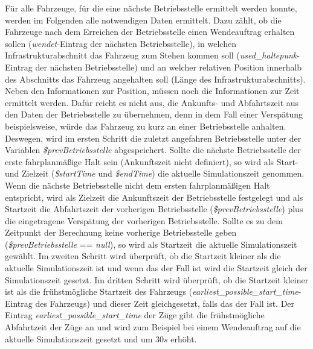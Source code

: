 Für alle Fahrzeuge, für die eine nächste Betriebsstelle ermittelt werden konnte, werden im Folgenden alle notwendigen Daten ermittelt. Dazu zählt, ob die Fahrzeuge nach dem Erreichen der Betriebsstelle einen Wendeauftrag erhalten sollen (\textit{wendet}-Eintrag der nächsten Betriebsstelle), in welchen Infrastrukturabschnitt das Fahrzeug zum Stehen kommen soll (\textit{used\_haltepunk}-Eintrag der nächsten Betriebsstelle) und an welcher relativen Position innerhalb des Abschnitts das Fahrzeug angehalten soll (Länge des Infrastrukturabschnitts). Neben den Informationen zur Position, müssen noch die Informationen zur Zeit ermittelt werden. Dafür reicht es nicht aus, die Ankunfts- und Abfahrtszeit aus den Daten der Betriebsstelle zu übernehmen, denn in dem Fall einer Verspätung beispielsweise, würde das Fahrzeug zu kurz an einer Betriebsstelle anhalten. Deswegen, wird im ersten Schritt die zuletzt angefahren Betriebsstelle unter der Variablen \textit{\$prevBetriebsstelle} abgespeichert. Sollte die nächste Betriebsstelle der erste fahrplanmäßige Halt sein (Ankunftszeit nicht definiert), so wird als Start- und Zielzeit (\textit{\$startTime} und \textit{\$endTime}) die aktuelle Simulationszeit genommen. Wenn die nächste Betriebsstelle nicht dem ersten fahrplanmäßigen Halt entspricht, wird als Zielzeit die Ankunftszeit der Betriebsstelle festgelegt und als Startzeit die Abfahrtszeit der vorherigen Betriebsstelle (\textit{\$prevBetriebsstelle}) plus die eingetragene Verspätung der vorherigen Betriebsstelle. Sollte es zu dem Zeitpunkt der Berechnung keine vorherige Betriebsstelle geben (\textit{\$prevBetriebsstelle} == \textit{null}), so wird als Startzeit die aktuelle Simulationszeit gewählt. Im zweiten Schritt wird überprüft, ob die Startzeit kleiner als die aktuelle Simulationszeit ist und wenn das der Fall ist wird die Startzeit gleich der Simulationszeit gesetzt. Im dritten Schritt wird überprüft, ob die Startzeit kleiner ist als die frühstmögliche Startzeit des Fahrzeugs (\textit{earliest\_possible\_start\_time}-Eintrag des Fahrzeugs) und dieser Zeit gleichgesetzt, falls das der Fall ist. Der Eintrag \textit{earliest\_possible\_start\_time} der Züge gibt die frühstmögliche Abfahrtzeit der Züge an und wird zum Beispiel bei einem Wendeauftrag auf die aktuelle Simulationszeit gesetzt und um 30$s$ erhöht. 

